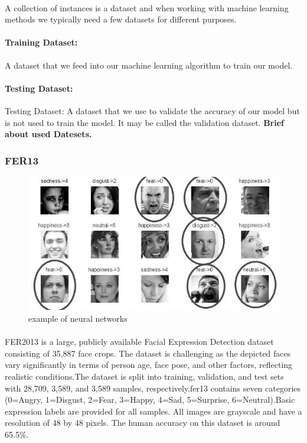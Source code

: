 \paragraph{}
A collection of instances is a dataset and when working with machine learning methods we typically need a few datasets for different purposes.
\paragraph{Training Dataset:}
 A dataset that we feed into our machine learning algorithm to train our model.
\paragraph{Testing Dataset:}
Testing Dataset: A dataset that we use to validate the accuracy of our model but is not used to train the model. It may be called the validation dataset.
\textbf{Brief about used Datesets.}
\subsubsection{FER13}
\begin{figure}
	\centering
	\includegraphics[width=.5\textwidth]{fer2013.jpg}
	\caption{example of neural networks}
\end{figure} 
\paragraph{}
FER2013 is a large, publicly available Facial Expression Detection dataset consisting of 35,887 face crops. The dataset is challenging as the depicted faces vary significantly in terms of person age, face pose, and other factors, reflecting realistic conditions.The dataset is split into training, validation, and test sets with 28,709, 3,589, and 3,589 samples, respectively.fer13 contains seven categories (0=Angry, 1=Disgust, 2=Fear, 3=Happy, 4=Sad, 5=Surprise, 6=Neutral).Basic expression labels are provided for all samples. All images are grayscale and have a resolution of 48 by 48 pixels. The human accuracy on this dataset is around 65.5\%.

